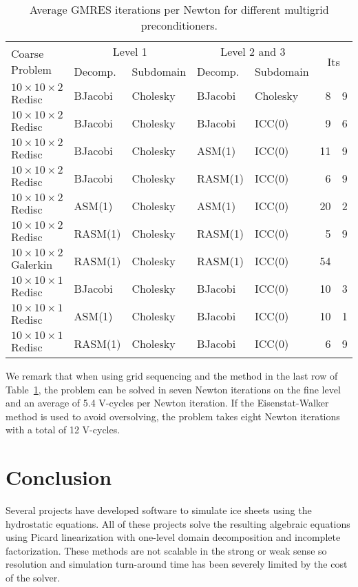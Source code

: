 \documentclass[draft,lineno,jgrga]{AGUTeX}
\begin{document}
\begin{article}
\begin{table}
  \centering\caption{Average GMRES iterations per Newton for different multigrid preconditioners.}\label{tab:xmg}
  \begin{tabular}{l|ll|ll|r@{.}l}
    \multirow{2}{*}{Coarse Problem} & \multicolumn{2}{c|}{Level 1} & \multicolumn{2}{c|}{Level 2 and 3} & \multicolumn{2}{c}{\multirow{2}{*}{Its}} \\
                                   & Decomp. & Subdomain & Decomp. & Subdomain         \\ \hline
    $10\times 10\times 2$ Redisc   & BJacobi & Cholesky & BJacobi & Cholesky & 8  & 9 \\
    $10\times 10\times 2$ Redisc   & BJacobi & Cholesky & BJacobi & ICC(0)   & 9  & 6 \\
    $10\times 10\times 2$ Redisc   & BJacobi & Cholesky & ASM(1)  & ICC(0)   & 11 & 9 \\
    $10\times 10\times 2$ Redisc   & BJacobi & Cholesky & RASM(1) & ICC(0)   & 6  & 9 \\
    $10\times 10\times 2$ Redisc   & ASM(1)  & Cholesky & ASM(1)  & ICC(0)   & 20 & 2 \\
    $10\times 10\times 2$ Redisc   & RASM(1) & Cholesky & RASM(1) & ICC(0)   & 5  & 9 \\
    $10\times 10\times 2$ Galerkin & RASM(1) & Cholesky & RASM(1) & ICC(0)   & 54 &   \\
    $10\times 10\times 1$ Redisc   & BJacobi & Cholesky & BJacobi & ICC(0)   & 10 & 3 \\
    $10\times 10\times 1$ Redisc   & ASM(1)  & Cholesky & BJacobi & ICC(0)   & 10 & 1 \\
    $10\times 10\times 1$ Redisc   & RASM(1) & Cholesky & BJacobi & ICC(0)   & 6  & 9 \\
  \end{tabular}
\end{table}

We remark that when using grid sequencing and the method in the last row of Table~\ref{tab:xmg}, the problem can be solved in seven Newton iterations on the fine level and an average of 5.4 V-cycles per Newton iteration.
If the Eisenstat-Walker method is used to avoid oversolving, the problem takes eight Newton iterations with a total of 12 V-cycles.

\section{Conclusion}
Several projects \citep{seacism,issm,johnson2007modeling,desmedt2010using,pattyn2003ntd} have developed software to simulate ice sheets using the hydrostatic equations.
All of these projects solve the resulting algebraic equations using Picard linearization with one-level domain decomposition and incomplete factorization.
These methods are not scalable in the strong or weak sense so resolution and simulation turn-around time has been severely limited by the cost of the solver.


\end{article}
\end{document}
